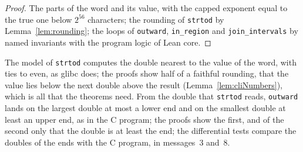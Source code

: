 \begin{proof}
  \leanok
  The parts of the word and its value, with the capped exponent equal to the true one below
  $2^{56}$ characters; the rounding of \verb|strtod| by Lemma~\ref{lem:rounding}; the loops of
  \verb|outward|, \verb|in_region| and \verb|join_intervals| by named invariants with the program
  logic of Lean core.
\end{proof}

The model of \verb|strtod| computes the double nearest to the value of the word, with ties to even,
as glibc does; the proofs show half of a faithful rounding, that the value lies below the next
double above the result (Lemma~\ref{lem:cliNumbers}), which is all that the theorems need. From the
double that \verb|strtod| reads, \verb|outward| lands on the largest double at most a lower end and
on the smallest double at least an upper end, as in the C program; the proofs show the first, and of
the second only that the double is at least the end; the differential tests compare the doubles of
the ends with the C program, in messages~3 and~8.

